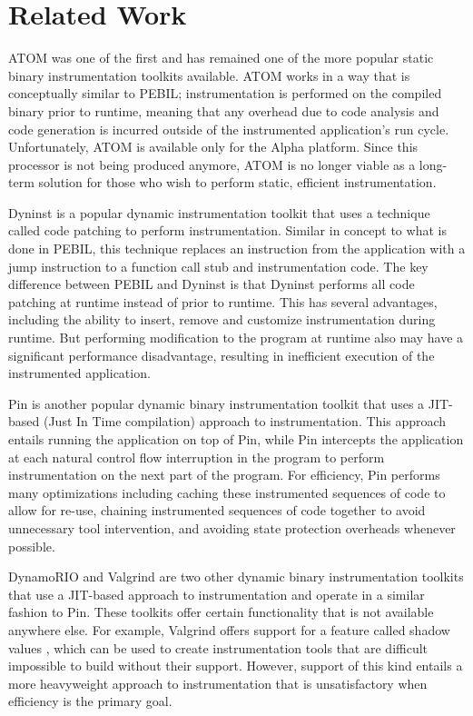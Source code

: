 \section{Related Work}
\label{sec:Related}

ATOM \cite{srivastava1994atom} was one of the first and has remained one of the more popular static binary instrumentation toolkits
available. ATOM works in a way that is conceptually similar to PEBIL; instrumentation is performed on the compiled
binary prior to runtime, meaning that any overhead due to code analysis and code generation is incurred outside of
the instrumented application's run cycle. Unfortunately, ATOM is available only for the Alpha platform. Since this
processor is not being produced anymore, ATOM is no longer viable as a long-term solution for those who wish to
perform static, efficient instrumentation. 

Dyninst \cite{buck2000api} is a popular dynamic instrumentation toolkit that uses a technique called code patching
to perform instrumentation. Similar in concept to what is done in PEBIL, this technique replaces an
instruction from the application with a jump instruction to a function call stub and
instrumentation code. The key difference between PEBIL and Dyninst is that Dyninst performs all code patching
at runtime instead of prior to runtime. This has several advantages, including the ability to insert, remove
and customize instrumentation during runtime. But performing modification to the program at runtime also
may have a significant performance disadvantage, resulting in inefficient execution of the instrumented application.

Pin \cite{luk2005pin} is another popular dynamic binary instrumentation toolkit that uses a JIT-based (Just In Time compilation) approach to
instrumentation. This approach entails running the application on top of Pin, while Pin intercepts the
application at each natural control flow interruption in the program to perform instrumentation on the next part of the
program. For efficiency, Pin performs many optimizations including caching these instrumented sequences of code to allow for
re-use, chaining instrumented sequences of code together to avoid unnecessary tool intervention, and avoiding state protection
overheads whenever possible.

DynamoRIO \cite{bruening2004efficient} and Valgrind \cite{nethercote2007valgrind} are two other dynamic
binary instrumentation toolkits that use a JIT-based approach to instrumentation and operate in a similar fashion
to Pin. These toolkits offer certain functionality that is not available anywhere else. For example, Valgrind offers
support for a feature called shadow values \cite{nethercote2007shadow}, 
which can be used to create instrumentation tools that are difficult impossible to build without
their support. However, support of this kind entails a more heavyweight approach to instrumentation that is
unsatisfactory when efficiency is the primary goal.
